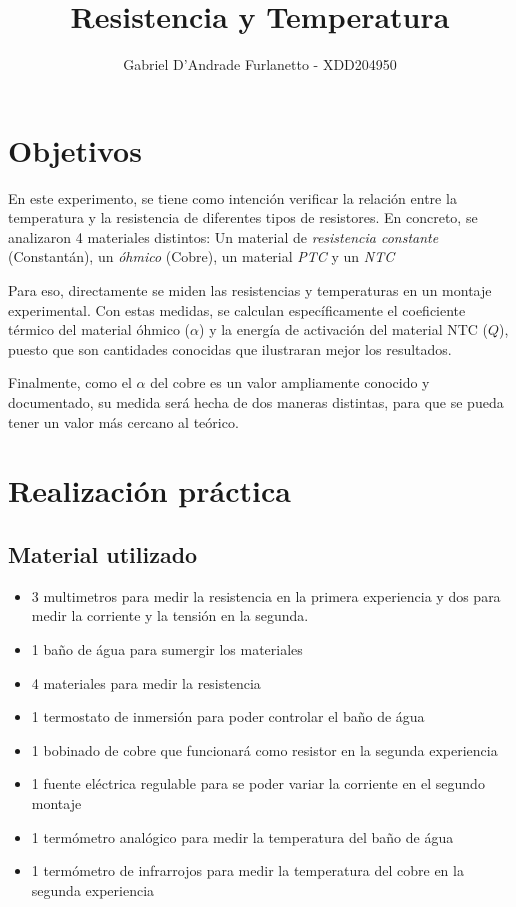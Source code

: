 \documentclass[a4paper,12pt]{article}
\begin{document}
\title{Resistencia y Temperatura}

\author{Gabriel D'Andrade Furlanetto - XDD204950}

\maketitle
\section{Objetivos}
En este experimento, se tiene como intención verificar la relación entre la temperatura y la resistencia de diferentes tipos de resistores. En concreto, se analizaron 4 materiales distintos: Un material de \textit{resistencia constante} (Constantán), un \textit{óhmico} (Cobre), un material \textit{PTC} y un \textit{NTC}

Para eso, directamente se miden las resistencias y temperaturas en un montaje experimental. Con estas medidas, se calculan específicamente el coeficiente térmico del material óhmico ($\alpha$) y la energía de activación del material NTC ($Q$), puesto que son cantidades conocidas que ilustraran mejor los resultados.

Finalmente, como el $\alpha$ del cobre es un valor ampliamente conocido y documentado, su medida será hecha de dos maneras distintas, para que se pueda tener un valor más cercano al teórico.

\section{Realización práctica}
\subsection{Material utilizado}
\begin{itemize}
    \item 3 multimetros para medir la resistencia en la primera experiencia y dos para medir la corriente y la tensión en la segunda.
    \item 1 baño de água para sumergir los materiales 
    \item 4 materiales para medir la resistencia 
    \item 1 termostato de inmersión para poder controlar el baño de água
    \item 1 bobinado de cobre que funcionará como resistor en la segunda experiencia 
    \item 1 fuente eléctrica regulable para se poder variar la corriente en el segundo montaje
    \item 1 termómetro analógico para medir la temperatura del baño de água
    \item 1 termómetro de infrarrojos para medir la temperatura del cobre en la segunda experiencia
\end{itemize}
\end{document}
